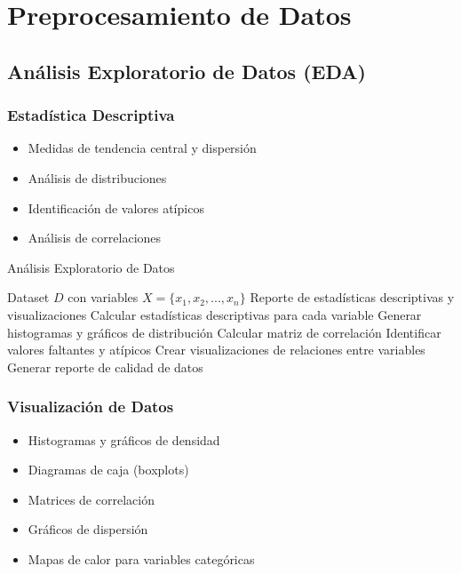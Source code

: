\section{Preprocesamiento de Datos}

\subsection{Análisis Exploratorio de Datos (EDA)}

\subsubsection{Estadística Descriptiva}

\begin{itemize}
    \item Medidas de tendencia central y dispersión
    \item Análisis de distribuciones
    \item Identificación de valores atípicos
    \item Análisis de correlaciones
\end{itemize}

\begin{algorithm}[htbp]
\caption{Análisis Exploratorio de Datos}
\begin{algorithmic}[1]
\REQUIRE Dataset $D$ con variables $X = \{x_1, x_2, ..., x_n\}$
\ENSURE Reporte de estadísticas descriptivas y visualizaciones
\STATE Calcular estadísticas descriptivas para cada variable
\STATE Generar histogramas y gráficos de distribución
\STATE Calcular matriz de correlación
\STATE Identificar valores faltantes y atípicos
\STATE Crear visualizaciones de relaciones entre variables
\STATE Generar reporte de calidad de datos
\end{algorithmic}
\end{algorithm}

\subsubsection{Visualización de Datos}

\begin{itemize}
    \item Histogramas y gráficos de densidad
    \item Diagramas de caja (boxplots)
    \item Matrices de correlación
    \item Gráficos de dispersión
    \item Mapas de calor para variables categóricas
\end{itemize}

